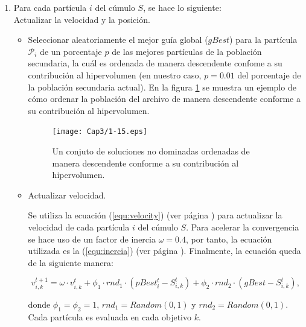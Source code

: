 \begin{enumerate}
\begin{enumerate}
  \item Para cada part\'icula $i$ del c\'umulo $S$, se hace lo siguiente: \\
    
    Actualizar la  velocidad y la posici\'on.
    
    \begin{itemize}
             
      \item Seleccionar aleatoriamente el mejor gu\'ia global ($gBest$) para la part\'icula $\mathcal{P}_i$ de un porcentaje $p$
      de las mejores part\'iculas de la poblaci\'on secundaria, la cu\'al es ordenada de manera descendente confome a su 
      contribuci\'on al hipervolumen (en nuestro caso, $p=0.01$ del porcentaje de la poblaci\'on secundaria actual). 
      En la figura \ref{fig:ordenado} se muestra un ejemplo de c\'omo ordenar la poblaci\'on del archivo de manera descendente 
      conforme a su contribuci\'on al hipervolumen. 

      \begin{figure}
      \begin{center}
	  \texttt{[image: Cap3/1-15.eps]}
      \end{center}
	\caption[Ejemplo de soluciones no dominadas ordenadas]{Un conjuto de soluciones no dominadas ordenadas de manera 
	descendente conforme a su contribuci\'on al hipervolumen.}
      \label{fig:ordenado}
      \end{figure}
      
      \item Actualizar velocidad. 
      
      Se utiliza la ecuaci\'on (\ref{equ:velocity}) (ver p\'agina \pageref{equ:velocity}) 
      para actualizar la velocidad de cada part\'icula $i$ del c\'umulo $S$. Para acelerar la convergencia 
      se hace uso de un factor de inercia $\omega = 0.4$, por tanto, la ecuaci\'on utilizada es la
      (\ref{equ:inercia}) (ver p\'agina \pageref{equ:inercia}). Finalmente, la ecuaci\'on queda de la siguiente 
      manera:	
      
       \[v^{t+1}_{i,k} = \omega \cdot v^t_{i,k} + \phi_1 \cdot rnd_1 \cdot \left(pBest^t_i - S^t_{i,k} \right) 
					    + \phi_2 \cdot rnd_2 \cdot \left(gBest - S^t_{i,k} \right),\]
      
      donde $\phi_1 = \phi_2 = 1$, $rnd_1 = Random(0, 1)$ y $rnd_2 = Random(0, 1)$. Cada part\'icula es evaluada 
      en cada objetivo $k$.
      

\end{itemize}
\end{enumerate}
\end{enumerate}
